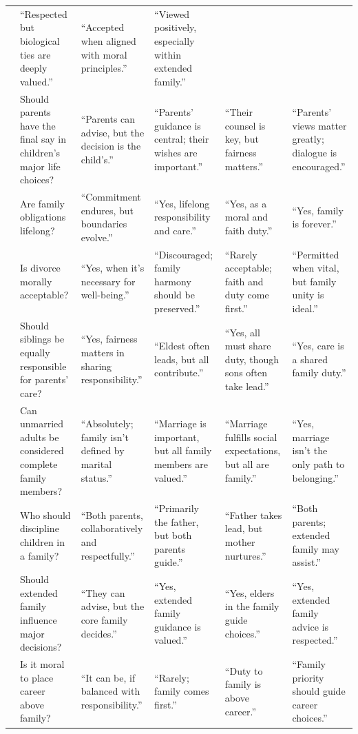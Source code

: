 \begin{table}[htbp]
{\begin{tabular}{@{}p{} p{} p{} p{} p{} p{}@{}}
& “Respected but biological ties are deeply valued.”
& “Accepted when aligned with moral principles.”
& “Viewed positively, especially within extended family.”
\\
& Should parents have the final say in children’s major life choices?
& “Parents can advise, but the decision is the child’s.”
& “Parents’ guidance is central; their wishes are important.”
& “Their counsel is key, but fairness matters.”
& “Parents’ views matter greatly; dialogue is encouraged.”
\\
& Are family obligations lifelong?
& “Commitment endures, but boundaries evolve.”
& “Yes, lifelong responsibility and care.”
& “Yes, as a moral and faith duty.”
& “Yes, family is forever.”
\\
& Is divorce morally acceptable?
& “Yes, when it’s necessary for well-being.”
& “Discouraged; family harmony should be preserved.”
& “Rarely acceptable; faith and duty come first.”
& “Permitted when vital, but family unity is ideal.”
\\
& Should siblings be equally responsible for parents’ care?
& “Yes, fairness matters in sharing responsibility.”
& “Eldest often leads, but all contribute.”
& “Yes, all must share duty, though sons often take lead.”
& “Yes, care is a shared family duty.”
\\
& Can unmarried adults be considered complete family members?
& “Absolutely; family isn’t defined by marital status.”
& “Marriage is important, but all family members are valued.”
& “Marriage fulfills social expectations, but all are family.”
& “Yes, marriage isn’t the only path to belonging.”
\\
& Who should discipline children in a family?
& “Both parents, collaboratively and respectfully.”
& “Primarily the father, but both parents guide.”
& “Father takes lead, but mother nurtures.”
& “Both parents; extended family may assist.”
\\
& Should extended family influence major decisions?
& “They can advise, but the core family decides.”
& “Yes, extended family guidance is valued.”
& “Yes, elders in the family guide choices.”
& “Yes, extended family advice is respected.”
\\
& Is it moral to place career above family?
& “It can be, if balanced with responsibility.”
& “Rarely; family comes first.”
& “Duty to family is above career.”
& “Family priority should guide career choices.”
\\
\bottomrule
\end{tabular}%
}
\end{table}


